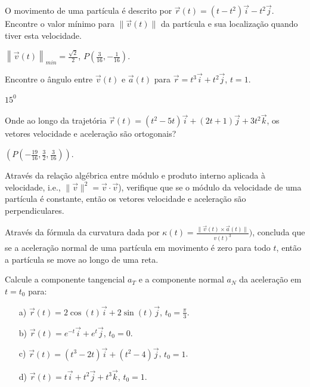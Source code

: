 \begin{exer}
O movimento de uma partícula é descrito por $\vec{r}(t)=(t-t^2)\vec{i}-t^2\vec{j}$. Encontre o valor mínimo  para $\|\vec{v}(t)\|$ da partícula e sua localização quando tiver esta velocidade.
\end{exer}
\begin{resp}
 $\left\|\vec{v}(t)\right\|_{min}=\frac{\sqrt{2}}{2}$, $P\left(\frac{3}{16},-\frac{1}{16}\right)$.
 \end{resp}
\begin{exer}
 Encontre o ângulo entre $\vec{v}(t)$ e $\vec{a}(t)$ para $\vec{r}=t^3\vec{i}+t^2\vec{j}$, $t=1$.
\end{exer}
\begin{resp}
 $15^0$
\end{resp}
\begin{exer}
 Onde ao longo da trajetória $\vec{r}(t)=(t^2-5t)\vec{i}+(2t+1)\vec{j}+3t^2\vec{k}$, os vetores velocidade e aceleração são ortogonais?
\end{exer}
\begin{resp}
 $\left(P\left(-\frac{19}{16},\frac{3}{2},\frac{3}{16}\right)\right)$.
\end{resp}
\begin{exer} Através da relação algébrica entre módulo e produto interno aplicada à velocidade, i.e., $\|\vec{v}\|^2=\vec{v}\cdot\vec{v}$), verifique  que se o módulo da velocidade de uma partícula é constante, então os vetores velocidade e aceleração são perpendiculares.
\end{exer}
\begin{exer} Através da fórmula da curvatura dada por $\kappa(t)=\frac{\|\vec{v}(t)\times \vec{a}(t)\|}{v(t)^3} )$, concluda que se a aceleração normal de uma partícula em movimento é zero para todo $t$, então a partícula se move ao longo de uma reta.
\end{exer}
\begin{exer} Calcule a componente tangencial $a_T$ e a componente normal $a_N$ da aceleração em $t=t_0$ para:
\begin{itemize}
 \item[a)] $\vec{r}(t)=2\cos(t)\vec{i}+2\sin(t)\vec{j}$, $t_0=\frac{\pi}{3}$.
 \item[b)] $\vec{r}(t)=e^{-t}\vec{i}+e^{t}\vec{j}$, $t_0=0$.
 \item[c)] $\vec{r}(t)=(t^3-2t)\vec{i}+(t^2-4)\vec{j}$, $t_0=1$.
 \item[d)] $\vec{r}(t)=t\vec{i}+t^2\vec{j}+t^3\vec{k}$, $t_0=1$.
\end{itemize}
\end{exer}
